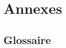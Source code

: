 \documentclass[11pt,twoside,a4paper]{article}
\begin{document}

\section{Annexes}

\subsection{Glossaire}
\end{document}
